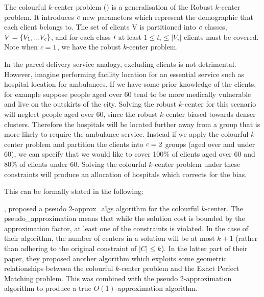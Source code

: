 The colourful $k$-center problem (\cite{bandyapadhyay_constant_2019}) is a generalisation of the Robust $k$-center problem. It introduces $\emph{c}$ new parameters which represent the demographic that each client belongs to. The set of clients V is partitioned into $\emph{c}$ classes, $V=\{V_1,... V_{\emph{c}}\}$, and for each class $\emph{i}$ at least $1\leq t_i \leq |V_i|$ clients must be covered. Note when $\emph{c}=1$, we have the robust $k$-center problem.

In the parcel delivery service analogy, excluding clients is not detrimental. However, imagine performing facility location for an essential service such as hospital location for ambulances. If we have some prior knowledge of the clients, for example suppose people aged over 60 tend to be more medically vulnerable and live on the outskirts of the city. Solving the robust $k$-center for this scenario will neglect people aged over 60, since the robust $k$-center biased towards denser clusters. Therefore the hospitals will be located further away from a group that is more likely to require the ambulance service. Instead if we apply the colourful $k$-center problem and partition the clients into $\emph{c}=2$ groups (aged over and under 60), we can specify that we would like to cover 100\% of clients aged over 60 and 80\% of clients under 60. Solving the colourful $k$-center problem under these constraints will produce an allocation of hospitals which corrects for the bias.

This can be formally stated in the following:


\citeauthor{bandyapadhyay_constant_2019}, proposed a pseudo $2$-\gls{approx_algs} algorithm for the colourful $k$-center. The \gls{pseudo_approximation} means that while the solution cost is bounded by the approximation factor, at least one of the constraints is violated. In the case of their algorithm, the number of centers in a solution will be at most $k+1$ (rather than adhering to the original constraint of $|C|\leq k$). In the latter part of their paper, they proposed another algorithm which exploits some geometric relationships between the colourful $k$-center problem and the Exact Perfect Matching problem. This was combined with the pseudo $2$-approximation algorithm to produce a true $O(1)$-approximation algorithm.

